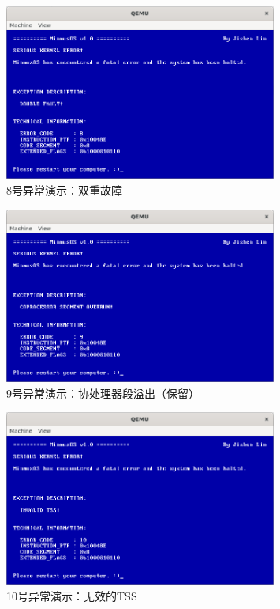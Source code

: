 \begin{figure}[htbp]
    \centering
    \includegraphics[width=0.8\textwidth]{figures/Exception8Presentation.png}
    \caption{8号异常演示：双重故障}
\end{figure}

\begin{figure}[htbp]
    \centering
    \includegraphics[width=0.8\textwidth]{figures/Exception9Presentation.png}
    \caption{9号异常演示：协处理器段溢出（保留）}
\end{figure}

\begin{figure}[htbp]
    \centering
    \includegraphics[width=0.8\textwidth]{figures/Exception10Presentation.png}
    \caption{10号异常演示：无效的TSS}
\end{figure}

